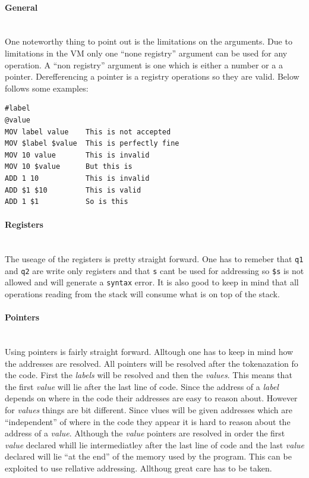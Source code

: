 \documentclass{article}
\newcommand{\V}{\verb}
\begin{document}
\paragraph{General} \
\\
One noteworthy thing to point out is the limitations on the arguments. Due to
limitations in the VM only one ``none registry'' argument can be used for any
operation. A ``non registry'' argument is one which is either a number or a
a pointer. Derefferencing a pointer is a registry operations so they are valid.
Below follows some examples:
\begin{verbatim}
#label
@value
MOV label value    This is not accepted
MOV $label $value  This is perfectly fine
MOV 10 value       This is invalid
MOV 10 $value      But this is
ADD 1 10           This is invalid
ADD $1 $10         This is valid
ADD 1 $1           So is this
\end{verbatim}

\paragraph{Registers} \
\\
The useage of the registers is pretty straight forward. One has to remeber that
\V+q1+ and \V+q2+ are write only registers and that \V+s+ cant be used for
addressing so \verb+$s+ is not allowed and will generate a \verb+syntax+ error.
It is also good to keep in mind that all operations reading from the stack will
consume what is on top of the stack.

\paragraph{Pointers} \
\\
Using pointers is fairly straight forward. Alltough one has to keep in mind how
the addresses are resolved. All pointers will be resolved after the
tokenazation fo the code. First the \emph{labels} will be resolved and then the
\emph{values}.
This means that the first \emph{value} will lie after the last line of code. Since the
address of a \emph{label} depends on where in the code their addresses are easy to
reason about. However for \emph{values} things are bit different. Since vlues
will be given addresses which are ``independent'' of where in the code they appear it is
hard to reason about the address of a \emph{value}. Although the \emph{value} pointers are
resolved in order the first \emph{value} declared whill lie intermediatley after the
last line of code and the last \emph{value} declared will lie ``at the end'' of the
memory used by the program. This can be exploited to use rellative addressing.
Allthoug great care has to be taken.
\end{document}
